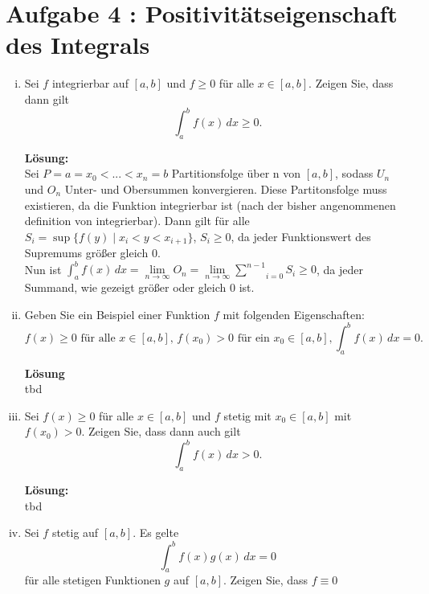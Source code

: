 \documentclass[11pt,a4paper,ngerman]{article}
\begin{document}
\section*{Aufgabe 4 : \mdseries Positivitätseigenschaft des Integrals}

\begin{enumerate}[i)]
    \item Sei $f$ integrierbar auf $[a,b]$ und $f\geq 0$ für alle $x \in [a,b]$. Zeigen Sie, dass dann gilt
$$
    \int_{a}^{b} f(x) \, dx \geq 0.
$$

\textbf{Lösung:}\\

Sei $P=a=x_0<...<x_n=b$ Partitionsfolge über n von $[a,b]$, sodass $U_n$ und $O_n$ Unter- und Obersummen konvergieren. Diese Partitonsfolge muss existieren, da die Funktion integrierbar ist (nach der bisher angenommenen definition von integrierbar). Dann gilt für alle $S_i = \sup \{ f(y) \; | \; x_i < y < x_{i+1} \}$, $S_i \geq 0$, da jeder Funktionswert des Supremums größer gleich $0$.\\
 Nun ist $\int_a^b f(x) \, dx = \underset{n \rightarrow \infty}{\lim} O_n = \underset{n \rightarrow \infty}{\lim} \underset{i=0}{\overset{n-1}{\sum}} S_i \geq 0$, da jeder Summand, wie gezeigt größer oder gleich 0 ist.

    \item Geben Sie ein Beispiel einer Funktion $f$ mit folgenden Eigenschaften:
$$
    f(x) \geq 0 \text{ für alle } x\in [a,b], \, f(x_0) > 0\text { für ein } x_0 \in [a,b], \int_{a}^{b} f(x) \, dx = 0.
$$

\textbf{Lösung}\\

tbd

    \item Sei $f(x) \geq 0$ für alle $x \in [a,b]$ und $f$ stetig mit $x_0 \in [a,b]$ mit $f(x_0) > 0$. Zeigen Sie, dass dann auch gilt
$$
    \int_{a}^{b} f(x) \, dx > 0.
$$

\textbf{Lösung:}\\

tbd

    \item Sei $f$ stetig auf $[a,b]$. Es gelte
$$
\int_{a}^{b} f(x)g(x) \, dx = 0
$$
für alle stetigen Funktionen $g$ auf $[a,b]$. Zeigen Sie, dass $f\equiv 0$
\end{enumerate}
\label{LastPage}
\end{document}
